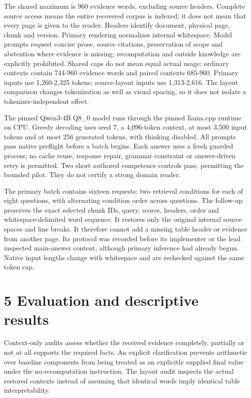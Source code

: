 \documentclass[11pt]{article}
\begin{document}
The shared maximum is 960 evidence words, excluding source headers. Complete source access means the entire recovered corpus is indexed; it does not mean that every page is given to the reader. Headers identify document, physical page, chunk and version. Primary rendering normalizes internal whitespace. Model prompts request concise prose, source citations, preservation of scope and abstention where evidence is missing; recomputation and outside knowledge are explicitly prohibited. Shared caps do not mean equal actual usage: ordinary contexts contain 744-960 evidence words and paired contexts 685-960. Primary inputs use 1,260-2,325 tokens; source-layout inputs use 1,313-2,616. The layout comparison changes tokenization as well as visual spacing, so it does not isolate a tokenizer-independent effect.

The pinned Qwen3-4B Q8\_0 model runs through the pinned llama.cpp runtime on CPU. Greedy decoding uses seed 7, a 4,096-token context, at most 3,500 input tokens and at most 256 generated tokens, with thinking disabled. All prompts pass native preflight before a batch begins. Each answer uses a fresh guarded process; no cache reuse, response repair, grammar constraint or answer-driven retry is permitted. Two short authored competence controls pass, permitting the bounded pilot. They do not certify a strong domain reader.

The primary batch contains sixteen requests: two retrieval conditions for each of eight questions, with alternating condition order across questions. The follow-up preserves the exact selected chunk IDs, query, scores, headers, order and whitespace-delimited word sequence. It restores only the original internal source spaces and line breaks. It therefore cannot add a missing table header or evidence from another page. Its protocol was recorded before its implementer or the lead inspected main-answer content, although primary inference had already begun. Native input lengths change with whitespace and are rechecked against the same token cap.

\section*{5  Evaluation and descriptive results}
Context-only audits assess whether the received evidence completely, partially or not at all supports the required facts. An explicit clarification prevents arithmetic over baseline components from being treated as an explicitly supplied final value under the no-recomputation instruction. The layout audit inspects the actual restored contexts instead of assuming that identical words imply identical table interpretability.
\end{document}
